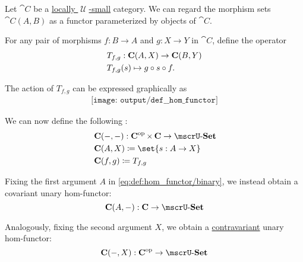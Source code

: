 \begin{definition}\label{def:hom_functor}
  Let \( \cat{C} \) be a \hyperref[def:category_size]{locally \( \mscrU \)-small} category. We can regard the morphism sets \( \cat{C}(A, B) \) as a functor parameterized by objects of \( \cat{C} \).

  \begin{thmenum}
     For any pair of morphisms \( f: B \to A \) and \( g: X \to Y \) in \( \cat{C} \), define the operator
    \begin{equation}\label{eq:def:hom_functor/t}
      \begin{aligned}
        &T_{f,g}: \cat{C}(A, X) \to \cat{C}(B, Y) \\
        &T_{f,g}(s) \mapsto g \bincirc s \bincirc f.
      \end{aligned}
    \end{equation}

    The action of \( T_{f,g} \) can be expressed graphically as
    \begin{equation}\label{eq:def:hom_functor/t_diagram}
      \begin{aligned}
        \texttt{[image: output/def\_\_hom\_functor]}
      \end{aligned}
    \end{equation}

    We can now define the following :
    \begin{equation}\label{eq:def:hom_functor/binary}
      \begin{aligned}
        &\cat{C}(\anon*, \anon*): \cat{C}^{\opcat} \times \cat{C} \to \ucat{Set} \\
        &\cat{C}(A, X) \coloneqq \set{ s: A \to X } \\
        &\cat{C}(f, g) \coloneqq T_{f,g}
      \end{aligned}
    \end{equation}

     Fixing the first argument \( A \) in \eqref{eq:def:hom_functor/binary}, we instead obtain a covariant unary hom-functor:
    \begin{equation}\label{eq:def:hom_functor/unary/covariant}
      \cat{C}(A, \anon*): \cat{C} \to \ucat{Set}
    \end{equation}

    Analogously, fixing the second argument \( X \), we obtain a \hyperref[def:hom_functor/unary]{contravariant} unary hom-functor:
    \begin{equation}\label{eq:def:hom_functor/unary/contravariant}
      \cat{C}(\anon*, X): \cat{C}^{\opcat} \to \ucat{Set}
    \end{equation}
  \end{thmenum}
\end{definition}
